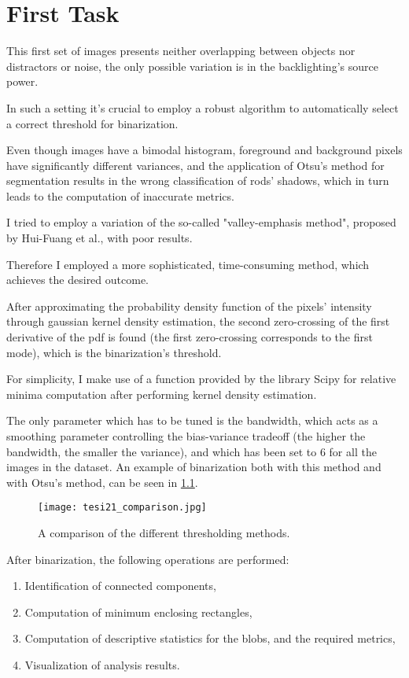 \chapter{First Task}
This first set of images presents neither overlapping between objects nor distractors or noise, the only possible variation is in the backlighting's source power. 

In such a setting it's crucial to employ a robust algorithm to automatically
select a correct threshold for binarization.

Even though images have a bimodal histogram, foreground and background pixels have significantly different variances, and the application of Otsu's method for segmentation results in the wrong classification of rods' shadows, which in turn leads to the computation of inaccurate metrics.

I tried to employ a variation of the so-called "valley-emphasis method", proposed by Hui-Fuang et al.\cite{otsu_improved}, with poor results. 

Therefore I employed a more sophisticated, time-consuming method, which achieves the desired outcome. 

After approximating the probability density function of the pixels' intensity through gaussian kernel density estimation, the second zero-crossing of the first derivative of the pdf is found (the first zero-crossing corresponds to the first mode), which is the binarization's threshold.

For simplicity, I make use of a function provided by the library Scipy for relative minima computation after performing kernel density estimation.

The only parameter which has to be tuned is the bandwidth, which acts as a smoothing parameter controlling the bias-variance tradeoff (the higher the bandwidth, the smaller the variance), and which has been set to 6 for all the images in the dataset.
An example of binarization both with this method and with Otsu's method, can be seen in \ref{fig:thresholds}.

\vspace{7 mm}
\begin{figure}[h]
    \centering
    \texttt{[image: tesi21\_comparison.jpg]}
    \caption{A comparison of the different thresholding methods.}
    \label{fig:thresholds}
\end{figure}

After binarization, the following operations are performed:
\begin{enumerate}
	\item Identification of connected components,
	\item Computation of minimum enclosing rectangles,
	\item Computation of descriptive statistics for the blobs, and the required metrics,
	\item Visualization of analysis results.
\end{enumerate}